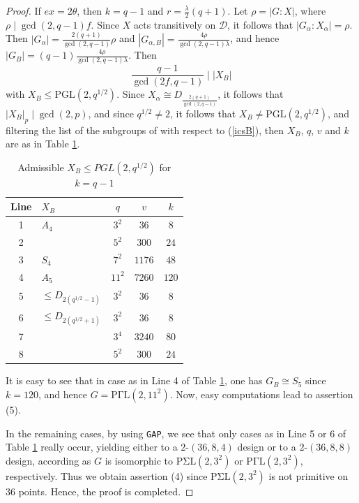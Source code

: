 \documentclass[a4paper,twopage,reqno,12pt]{amsart}
\theoremstyle{definition}
\numberwithin{equation}{section}
\newcommand{\PGL}{\mathrm{PGL}}
\newcommand{\PGaL}{\mathrm{P\Gamma L}}
\newcommand{\PSiL}{\mathrm{P \Sigma L}}
\renewcommand{\leq}{\leqslant}
\begin{document}
\begin{proof}
If $ex=2\theta $, then $k=q-1$ and $r=\frac{\lambda }{2}(q+1)$. Let  $\rho=\left\vert G:X \right\vert$, where $\rho \mid \gcd(2,q-1)f$. Since $X$ acts transitively on $\mathcal{D}$, it follows that $\left\vert G_{\alpha}:X_{\alpha}\right\vert=\rho$. Then $\left\vert G_{\alpha}\right\vert=\frac{2(q+1)}{\gcd(2,q-1)}\rho$ and $\left\vert G_{\alpha,B}\right\vert=\frac{4\rho}{\gcd(2,q-1)\lambda}$, and hence $\left\vert G_{B}\right\vert=(q-1)\frac{4\rho}{\gcd(2,q-1)\lambda}$. Then 
\begin{equation}\label{icsB}
\frac{q-1}{\gcd(2f,q-1)}\mid \left \vert X_{B}\right\vert
\end{equation}
with $X_{B}\leq \PGL(2,q^{1/2})$. Since $X_{\alpha}\cong D_{\frac{2(q+1)}{\gcd(2,q-1)}}$, it follows that $\left\vert X_{B}\right\vert_{p}\mid \gcd(2,p)$, and since $q^{1/2}\neq 2$, it follows that $X_{B}\neq \PGL(2,q^{1/2})$, and filtering the list of the subgroups of \cite[Theorem 2]{COT} with respect to (\ref{icsB}), then $X_{B}$, $q$, $v$ and $k$ are as in Table \ref{tab:XBinPGL}.
\begin{table}[htbp]
\tiny
    \centering
    \caption{Admissible $X_B\leq PGL(2,q^{1/2})$ for $k=q-1$}\label{tab:XBinPGL}
    \begin{tabular}{clccc}
    Line & $X_{B}$ & $q$ & $v$ & $k$ \\
       \toprule
       1 & $A_{4}$  & $3^{2}$    & $36$ &  $8$    \\
       2  &         & $5^{2}$     & $300$     & $24$ \\
       3  &  $S_{4}$  &  $7^{2}$    &   $1176$  & $48$ \\
       4  &  $A_{5}$       &  $11^{2}$  & $7260$ &  $120$ \\
       5  &  $\leq D_{2(q^{1/2}-1)}$       &  $3^{2}$ &  $36$ &  $8$ \\
       6  &  $\leq D_{2(q^{1/2}+1)}$       &  $3^{2}$  & $36$ &  $8$ \\
       7  &         &  $3^{4}$  & $3240$ &  $80$ \\
       8  &          & $5^{2}$     & $300$  & $24$ \\
        \bottomrule
    \end{tabular}
\end{table}
It is easy to see that in case as in Line 4 of Table \ref{tab:XBinPGL}, one has $G_{B}\cong S_{5}$ since $k=120$, and hence $G=\PGaL(2,11^{2})$. Now, easy computations lead to assertion (5). %

In the remaining cases, by using \texttt{GAP}, we see that only cases as in Line 5 or 6 of Table \ref{tab:XBinPGL} really occur, yielding either to a $2$-$(36,8,4)$ design or to a $2$-$(36,8,8)$ design, according as $G$ is isomorphic to $\PSiL(2,3^{2})$ or $\PGaL(2,3^{2})$, respectively. Thus we obtain assertion (4) since $\PSiL(2,3^2)$ is not primitive on $36$ points. Hence, the proof is completed. 
\end{proof}
\end{document}
